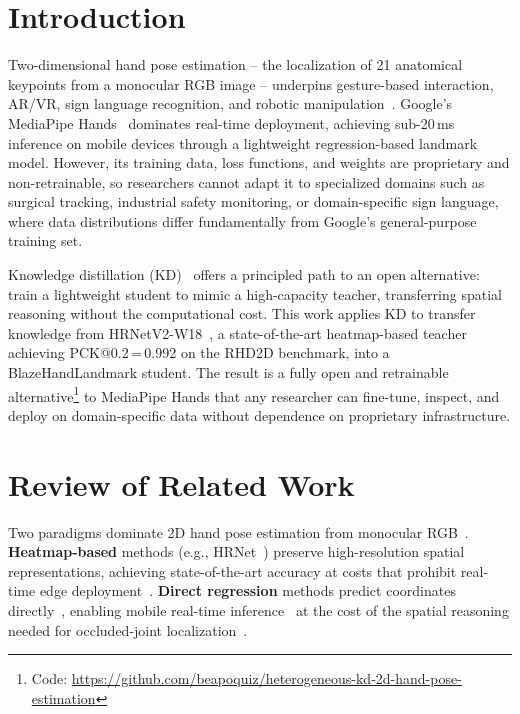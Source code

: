 \documentclass[11pt,conference,a4paper]{APSIPA2026}
\begin{document}
\section{Introduction}

Two-dimensional hand pose estimation -- the localization of 21
anatomical keypoints from a monocular RGB image -- underpins
gesture-based interaction, AR/VR, sign language recognition, and
robotic manipulation~\cite{doosti2019survey,an2025rejshand}.
Google's MediaPipe Hands~\cite{mediapipe2020} dominates real-time
deployment, achieving sub-20\,ms inference on mobile devices through
a lightweight regression-based landmark model. However, its training
data, loss functions, and weights are proprietary and
non-retrainable, so researchers cannot adapt it to specialized
domains such as surgical tracking, industrial safety monitoring, or
domain-specific sign language, where data distributions differ
fundamentally from Google's general-purpose training set.

Knowledge distillation (KD)~\cite{hinton2015distilling} offers a
principled path to an open alternative: train a lightweight student
to mimic a high-capacity teacher, transferring spatial reasoning
without the computational cost. This work applies KD to transfer
knowledge from HRNetV2-W18~\cite{hrnet2019}, a state-of-the-art
heatmap-based teacher achieving PCK@0.2\,=\,0.992 on the RHD2D
benchmark, into a BlazeHandLandmark student. The result is a fully
open and retrainable alternative\footnote{Code:
\url{https://github.com/beapoquiz/heterogeneous-kd-2d-hand-pose-estimation}}
to MediaPipe Hands that any researcher can fine-tune, inspect, and
deploy on domain-specific data without dependence on proprietary
infrastructure.

\section{Review of Related Work}
\label{sec:related}

Two paradigms dominate 2D hand pose estimation from monocular
RGB~\cite{doosti2019survey}. \textbf{Heatmap-based} methods (e.g.,
HRNet~\cite{hrnet2019}) preserve high-resolution spatial
representations, achieving state-of-the-art accuracy at costs that
prohibit real-time edge deployment~\cite{litehrnet2021}.
\textbf{Direct regression} methods predict coordinates
directly~\cite{toshev2014deeppose}, enabling mobile real-time
inference~\cite{howard2017mobilenets} at the cost of the spatial
reasoning needed for occluded-joint localization~\cite{sun2018integral}.
\end{document}

